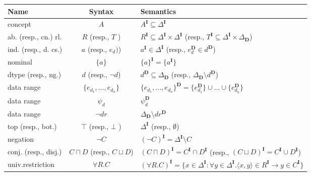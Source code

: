 \documentclass[a4paper]{llncs}
\newcommand{\I}{\mathbf{I}}
\newcommand{\D}{\mathbf{D}}
\begin{document}
{\small
\begin{longtable}{|>{\centering}m{2.5cm}|c|>{\centering\arraybackslash}m{7.5cm}|}
\hline
Name & Syntax & Semantics \\
\hline

concept & $A$ & $ A^\I \subseteq \Delta^\I$\\

ab. (resp., cn.) rl. & $R$ (resp., $T$ )& $R^\I \subseteq \Delta^\I \times \Delta^\I$ \hspace*{0.5cm} (resp., $T^\I \subseteq \Delta^\I \times \Delta_\D$)\\



\scriptsize{ind. (resp., d. cs.)}& $a$ (resp., $e_{d})$)& $a^\I \in \Delta^\I$ (resp., $e_{d}^{\D} \in d^\D$)\\

nominal & $\{a\}$ & $\{a\}^\I = \{a^\I \}$\\

dtype  (resp., ng.) & $d$ (resp., $\neg d$)& $ d^\D \subseteq \Delta_\D$ (resp., $\Delta_\D \setminus d^\D $)\\





\hline
data range  & $\{ e_{d_1}, \ldots , e_{d_n} \}$& $\{ e_{d_1}, \ldots , e_{d_n} \}^\D = \{e_{d_1}^\D \} \cup \ldots \cup \{e_{d_n}^\D \} $ \\

data range   &  $\psi_d$ & $\psi_d^\D$\\

data range    & $\neg dr$ &  $\Delta_\D \setminus dr^\D $\\

\hline

top (resp., bot.) & $\top$ (resp., $\bot$ )& $\Delta^\I$  (resp., $\emptyset$)\\



negation & $\neg C$ & $(\neg C)^\I = \Delta^\I \setminus C$ \\

conj. (resp., disj.) & $C \sqcap D$ (resp., $C \sqcup D$)& $ (C \sqcap D)^\I = C^\I \cap D^\I$  (resp., $ (C \sqcup D)^\I = C^\I \cup D^\I$)\\



univ.restriction & $\forall R.C$& $(\forall R.C)^\I = \{ x \in \Delta^\I : \forall y \in \Delta^\I \textbf{.} \langle x,y \rangle \in R^\I \rightarrow y \in C^\I \}$ \\


\end{longtable}}
\end{document}
